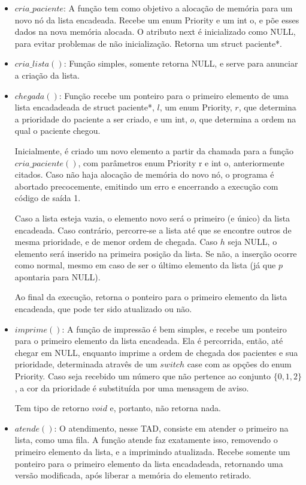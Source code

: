 \documentclass{article}
\begin{document}
\begin{itemize}
\item $cria\_paciente$: 
A função tem como objetivo a alocação de memória para um novo nó da lista encadeada. Recebe um enum Priority e um int o, e põe esses dados na nova memória alocada. O atributo next é inicializado como NULL, para evitar problemas de não inicialização. Retorna um struct paciente*.

\item $cria\_lista()$:
Função simples, somente retorna NULL, e serve para anunciar a criação da lista. 

\item $chegada()$:
Função recebe um ponteiro para o primeiro elemento de uma lista encadadeada de struct paciente*, $l$, um enum Priority, $r$, que determina a prioridade do paciente a ser criado, e um int, $o$, que determina a ordem na qual o paciente chegou. 

Inicialmente, é criado um novo elemento a partir da chamada para a função $cria\_paciente()$, com parâmetros enum Priority r e int o, anteriormente citados. Caso não haja alocação de memória do novo nó, o programa é abortado precocemente, emitindo um erro e encerrando a execução com código de saída 1. 

Caso a lista esteja vazia, o elemento novo será o primeiro (e único) da lista encadeada. Caso contrário, percorre-se a lista até que se encontre outros de mesma prioridade, e de menor ordem de chegada. Caso $h$ seja NULL, o elemento será inserido na primeira posição da lista. Se não, a inserção ocorre como normal, mesmo em caso de ser o último elemento da lista (já que $p$ apontaria para NULL). 

Ao final da execução, retorna o ponteiro para o primeiro elemento da lista encadeada, que pode ter sido atualizado ou não.

\item $imprime()$: 
A função de impressão é bem simples, e recebe um ponteiro para o primeiro elemento da lista encadeada. Ela é percorrida, então, até chegar em NULL, enquanto imprime a ordem de chegada dos pacientes e sua prioridade, determinada atravês de um $switch$ case com as opções do enum Priority. Caso seja recebido um número que não pertence ao conjunto $\{0, 1, 2\}$, a cor da prioridade é substituída por uma mensagem de aviso. 

Tem tipo de retorno $void$ e, portanto, não retorna nada. 

\item $atende()$:
O atendimento, nesse TAD, consiste em atender o primeiro na lista, como uma fila. A função atende faz exatamente isso, removendo o primeiro elemento da lista, e a imprimindo atualizada. Recebe somente um ponteiro para o primeiro elemento da lista encadadeada, retornando uma versão modificada, após liberar a memória do elemento retirado. 


\end{itemize}
\end{document}
